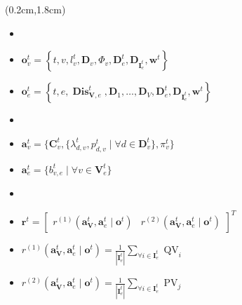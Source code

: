 \begin{frame}
\begin{center}
\begin{textblock*}{0.6\textwidth}(0.2cm,1.8cm)
\begin{itemize} \englishfont
	\item[\ding{111}] {\color{cqublue}{系统状态}}
	\item {\small{$\boldsymbol{o}_{v}^{t}=\left\{t, v, l_{v}^t, \mathbf{D}_{v}, \Phi_{v}, \mathbf{D}_{e}^{t}, \mathbf{D}_{\mathbf{I}_e^t}, \boldsymbol{w}^{t}\right\}$}}
	\item {\small{$\boldsymbol{o}_{e}^{t}=\left\{t, e, \operatorname{\mathbf{Dis}}_{\mathbf{V}, e}^{t}, \mathbf{D}_{1}, \ldots, \mathbf{D}_{V}, \mathbf{D}_{e}^{t}, \mathbf{D}_{\mathbf{I}_e^t}, \boldsymbol{w}^{t} \right\}$}}
	\item[\ding{111}] {\color{cqublue}{动作空间}}
	\item {\small{$\boldsymbol{a}_{v}^{t} = \{ \mathbf{C}_v^t,  \{ \lambda_{d, v}^{t}, p_{d, v}^{t} \mid \forall d \in \mathbf{D}_{v}^t \} , \pi_v^t   \}$}}
	\item {\small{$\boldsymbol{a}_{e}^{t} = \{b_{v, e}^{t} \mid \forall v \in \mathbf{V}_{e}^{t}\}$}}
	\item[\ding{111}] {\color{cqublue}{奖励函数}}
	\item {\small{$\boldsymbol{r}^{t} = \begin{bmatrix}  r^{(1)}\left(\boldsymbol{a}_{\mathbf{V}}^{t},\boldsymbol{a}_{e}^{t} \mid \boldsymbol{o}^{t}\right)  &  r^{(2)}\left(\boldsymbol{a}_{\mathbf{V}}^{t},\boldsymbol{a}_{e}^{t} \mid \boldsymbol{o}^{t}\right) \end{bmatrix} ^{T}$}}
	\item {\small{$r^{(1)}\left(\boldsymbol{a}_{\mathbf{V}}^{t},\boldsymbol{a}_{e}^{t} \mid \boldsymbol{o}^{t}\right)=\frac{1}{\left|\mathbf{I}_e^t\right|} \sum_{\forall i \in \mathbf{I}_e^t}\operatorname{QV}_{i}$}}
	\item {\small{$r^{(2)}\left(\boldsymbol{a}_{\mathbf{V}}^{t},\boldsymbol{a}_{e}^{t} \mid \boldsymbol{o}^{t}\right)=\frac{1}{\left|\mathbf{I}_e^t\right|} \sum_{\forall i \in \mathbf{I}_e^t} \operatorname{PV}_{j}$}}
\end{itemize}
\end{textblock*}
\end{center}
\end{frame}

